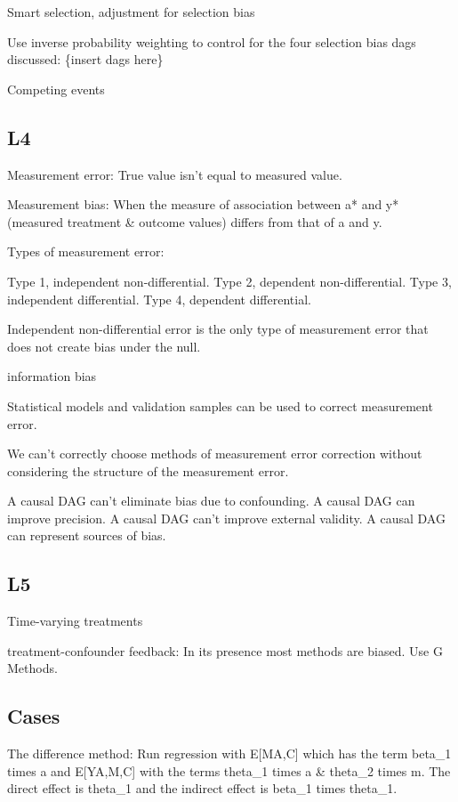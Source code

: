 \documentclass[]{book}
\begin{document}
Smart selection, adjustment for selection bias

Use inverse probability weighting to control for the four selection bias
dags discussed: \{insert dags here\}

Competing events

\subsection{L4}\label{l4}

Measurement error: True value isn't equal to measured value.

Measurement bias: When the measure of association between a* and y*
(measured treatment \& outcome values) differs from that of a and y.

Types of measurement error:

Type 1, independent non-differential. Type 2, dependent
non-differential. Type 3, independent differential. Type 4, dependent
differential.

Independent non-differential error is the only type of measurement error
that does not create bias under the null.

information bias

Statistical models and validation samples can be used to correct
measurement error.

We can't correctly choose methods of measurement error correction
without considering the structure of the measurement error.

A causal DAG can't eliminate bias due to confounding. A causal DAG can
improve precision. A causal DAG can't improve external validity. A
causal DAG can represent sources of bias.

\subsection{L5}\label{l5}

Time-varying treatments

treatment-confounder feedback: In its presence most methods are biased.
Use G Methods.

\subsection{Cases}\label{cases}

The difference method: Run regression with E{[}M\textbar{}A,C{]} which
has the term beta\_1 times a and E{[}Y\textbar{}A,M,C{]} with the terms
theta\_1 times a \& theta\_2 times m. The direct effect is theta\_1 and
the indirect effect is beta\_1 times theta\_1.
\end{document}
